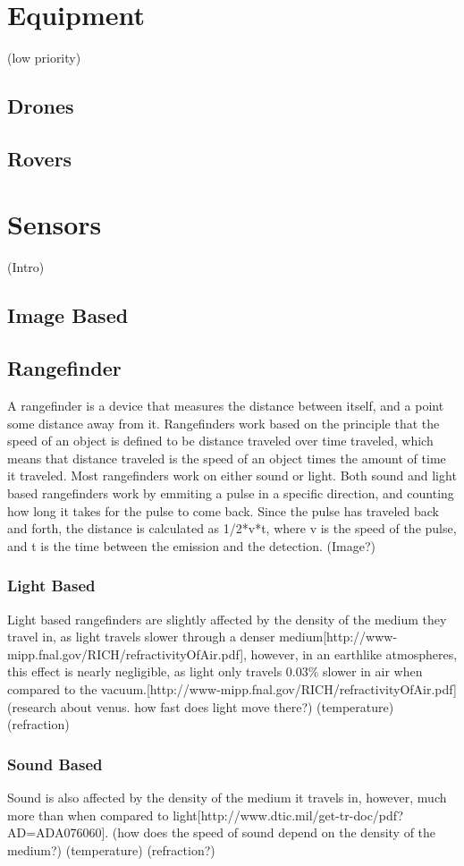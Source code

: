 \section{Equipment}
(low priority)
\subsection{Drones}
\subsection{Rovers}

\section{Sensors}
(Intro)
\subsection{Image Based}

\subsection{Rangefinder}
A rangefinder is a device that measures the distance between itself, and a point some distance away from it. Rangefinders work based on the principle that the speed of an object is defined to be distance traveled over time traveled, which means that distance traveled is the speed of an object times the amount of time it traveled. Most rangefinders work on either sound or light. Both sound and light based rangefinders work by emmiting a pulse in a specific direction, and counting how long it takes for the pulse to come back. Since the pulse has traveled back and forth, the distance is calculated as {1/2*v*t}, where {v} is the speed of the pulse, and {t} is the time between the emission and the detection.
(Image?)
\subsubsection{Light Based}
Light based rangefinders are slightly affected by the density of the medium they travel in, as light travels slower through a denser medium[http://www-mipp.fnal.gov/RICH/refractivityOfAir.pdf], however, in an earthlike atmospheres, this effect is nearly negligible, as light only travels 0.03\% slower in air when compared to the vacuum.[http://www-mipp.fnal.gov/RICH/refractivityOfAir.pdf] (research about venus. how fast does light move there?)
(temperature)
(refraction)
\subsubsection{Sound Based}
Sound is also affected by the density of the medium it travels in, however, much more than when compared to light[http://www.dtic.mil/get-tr-doc/pdf?AD=ADA076060]. (how does the speed of sound depend on the density of the medium?)
(temperature)
(refraction?)
